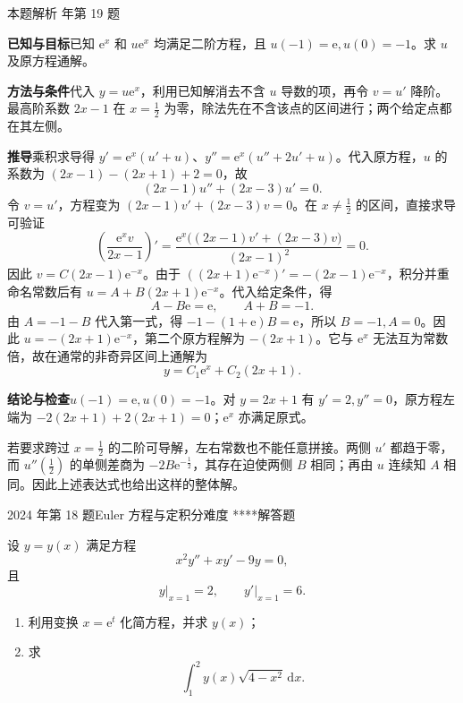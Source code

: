 \documentclass[UTF8,zihao=-4,fontset=fandol]{ctexart}
\newcounter{BankQuestion}
\newcommand{\QuestionPage}[7]{%
  \stepcounter{BankQuestion}%
  \par\noindent\begin{minipage}{\linewidth}
  \raggedright
  {\small\textcolor{black!60}{#3\quad #5\quad 难度 #7}\hfill\textcolor{accent}{#2}}\par\smallskip}
\newcommand{\QuestionEnd}{\end{minipage}\par\medskip}
\newcommand{\QuestionPage}[7]{%
  \clearpage
  \stepcounter{BankQuestion}%
  {\small\textcolor{accent}{#1\hfill #2}}\par\medskip
  {\small\textcolor{black!60}{#3\quad #5\quad 难度 #7\hfill \arabic{BankQuestion} / 234}}\par\vspace{9bp}}
\newcommand{\QuestionEnd}{}
\newenvironment{QuestionSolution}[1]{%
  \clearpage
  {\small\textcolor{black!60}{本题解析\quad #1}}\par\medskip
}{\par\clearpage}
\begin{document}
\begin{QuestionSolution}{2016 年第 19 题}
\textbf{已知与目标}\quad 已知 \(\mathrm{e}^x\) 和 \(u\mathrm{e}^x\) 均满足二阶方程，且 \(u(-1)=\mathrm{e},u(0)=-1\)。求 \(u\) 及原方程通解。

\textbf{方法与条件}\quad 代入 \(y=u\mathrm{e}^x\)，利用已知解消去不含 \(u\) 导数的项，再令 \(v=u'\) 降阶。最高阶系数 \(2x-1\) 在 \(x=\frac{1}{2}\) 为零，除法先在不含该点的区间进行；两个给定点都在其左侧。

\textbf{推导}\quad 乘积求导得 \(y'=\mathrm{e}^x(u'+u)\)、\(y''=\mathrm{e}^x(u''+2u'+u)\)。代入原方程，\(u\) 的系数为 \((2x-1)-(2x+1)+2=0\)，故
\[
(2x-1)u''+(2x-3)u'=0.
\]
令 \(v=u'\)，方程变为 \((2x-1)v'+(2x-3)v=0\)。在 \(x\ne\frac{1}{2}\) 的区间，直接求导可验证
\[
\left(\frac{\mathrm{e}^xv}{2x-1}\right)'
=\frac{\mathrm{e}^x\bigl((2x-1)v'+(2x-3)v\bigr)}{(2x-1)^2}=0.
\]
因此 \(v=C(2x-1)\mathrm{e}^{-x}\)。由于 \(((2x+1)\mathrm{e}^{-x})'=-(2x-1)\mathrm{e}^{-x}\)，积分并重命名常数后有 \(u=A+B(2x+1)\mathrm{e}^{-x}\)。代入给定条件，得
\[
A-B\mathrm{e}=\mathrm{e},\qquad A+B=-1.
\]
由 \(A=-1-B\) 代入第一式，得 \(-1-(1+\mathrm{e})B=\mathrm{e}\)，所以 \(B=-1,A=0\)。因此 \(\boxed{u=-(2x+1)\mathrm{e}^{-x}}\)，第二个原方程解为 \(-(2x+1)\)。它与 \(\mathrm{e}^x\) 无法互为常数倍，故在通常的非奇异区间上通解为
\[
\boxed{y=C_1\mathrm{e}^x+C_2(2x+1)}.
\]

\textbf{结论与检查}\quad \(u(-1)=\mathrm{e},u(0)=-1\)。对 \(y=2x+1\) 有 \(y'=2,y''=0\)，原方程左端为 \(-2(2x+1)+2(2x+1)=0\)；\(\mathrm{e}^x\) 亦满足原式。

若要求跨过 \(x=\frac{1}{2}\) 的二阶可导解，左右常数也不能任意拼接。两侧 \(u'\) 都趋于零，而 \(u''(\frac{1}{2})\) 的单侧差商为 \(-2B\mathrm{e}^{-\frac{1}{2}}\)，其存在迫使两侧 \(B\) 相同；再由 \(u\) 连续知 \(A\) 相同。因此上述表达式也给出这样的整体解。
\end{QuestionSolution}

\QuestionPage{4.2 高阶线性微分方程}{解答题}{2024 年第 18 题}{3}{Euler 方程与定积分}{234 / 234}{****}
设 \(y=y(x)\) 满足方程
\[x^2y''+xy'-9y=0,
\]
且
\[y\big|_{x=1}=2,\qquad y'\big|_{x=1}=6.
\]
\begin{enumerate}
\item 利用变换 \(x=\mathrm{e}^t\) 化简方程，并求 \(y(x)\)；
\item 求
\[\int_1^2 y(x)\sqrt{4-x^2}\,\mathrm{d}x.
\]
\end{enumerate}
\QuestionEnd
\end{document}
